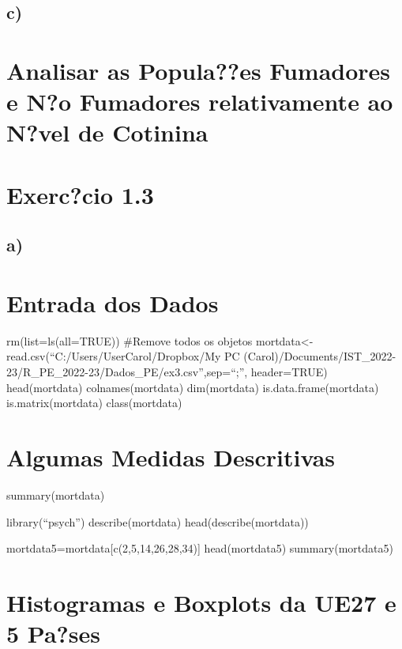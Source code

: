 \documentclass[
]{article}
\begin{document}
\hypertarget{c-1}{%
\subsection{c)}\label{c-1}}

\hypertarget{analisar-as-populaes-fumadores-e-no-fumadores-relativamente-ao-nvel-de-cotinina}{%
\section{Analisar as Popula??es Fumadores e N?o Fumadores relativamente
ao N?vel de
Cotinina}\label{analisar-as-populaes-fumadores-e-no-fumadores-relativamente-ao-nvel-de-cotinina}}

\hypertarget{exerccio-1.3}{%
\section{Exerc?cio 1.3}\label{exerccio-1.3}}

\hypertarget{a-2}{%
\subsection{a)}\label{a-2}}

\hypertarget{entrada-dos-dados-1}{%
\section{Entrada dos Dados}\label{entrada-dos-dados-1}}

rm(list=ls(all=TRUE)) \#Remove todos os objetos
mortdata\textless-read.csv(``C:/Users/UserCarol/Dropbox/My PC
(Carol)/Documents/IST\_2022-23/R\_PE\_2022-23/Dados\_PE/ex3.csv'',sep=``;'',
header=TRUE) head(mortdata) colnames(mortdata) dim(mortdata)
is.data.frame(mortdata) is.matrix(mortdata) class(mortdata)

\hypertarget{algumas-medidas-descritivas-1}{%
\section{Algumas Medidas
Descritivas}\label{algumas-medidas-descritivas-1}}

summary(mortdata)

library(``psych'') describe(mortdata) head(describe(mortdata))

mortdata5=mortdata{[}c(2,5,14,26,28,34){]} head(mortdata5)
summary(mortdata5)

\hypertarget{histogramas-e-boxplots-da-ue27-e-5-pases}{%
\section{Histogramas e Boxplots da UE27 e 5
Pa?ses}\label{histogramas-e-boxplots-da-ue27-e-5-pases}}
\end{document}
